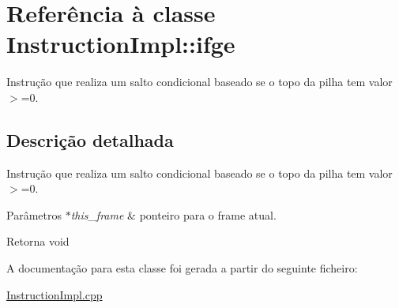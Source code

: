 \hypertarget{class_instruction_impl_1_1ifge}{}\section{Referência à classe Instruction\+Impl\+:\+:ifge}
\label{class_instruction_impl_1_1ifge}


Instrução que realiza um salto condicional baseado se o topo da pilha tem valor $>$=0.  




\subsection{Descrição detalhada}
Instrução que realiza um salto condicional baseado se o topo da pilha tem valor $>$=0. 


\begin{DoxyParams}{Parâmetros}
{\em $\ast$this\+\_\+frame} & ponteiro para o frame atual. \\
\hline
\end{DoxyParams}
\begin{DoxyReturn}{Retorna}
void 
\end{DoxyReturn}


A documentação para esta classe foi gerada a partir do seguinte ficheiro\+:\begin{DoxyCompactItemize}
\item 
\hyperlink{_instruction_impl_8cpp}{Instruction\+Impl.\+cpp}\end{DoxyCompactItemize}
